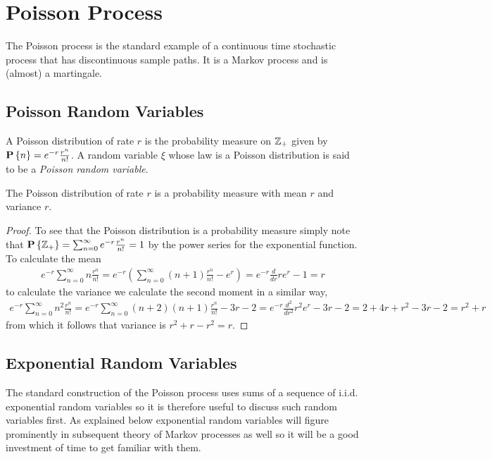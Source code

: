 \section{Poisson Process}
The Poisson process is the standard example of a continuous time
stochastic process that has discontinuous sample paths.  It is a
Markov process and is (almost) a martingale.  

\subsection{Poisson Random Variables}

\begin{defn}A Poisson distribution of rate $r$ is the probability
  measure on $\mathbb{Z}_+$ given by $\textbf{P}\left \{n \right \} = e^{-r}
  \frac{r^n}{n!}$. A random variable $\xi$ whose law is a Poisson
  distribution is said to be a \emph{Poisson random variable}.
\end{defn}

\begin{prop}\label{MomentsPoissonDistribution}The Poisson distribution of rate $r$ is a probability measure with mean $r$ and variance $r$.
\end{prop}
\begin{proof}
To see that the Poisson distribution is a probability measure simply note that $\textbf{P}\left \{\mathbb{Z}_+ \right \} = \sum_{n=0}^\infty  e^{-r} \frac{r^n}{n!} =1$ by the power series for the exponential function.  To calculate the mean 
\begin{align*}
e^{-r} \sum_{n=0}^\infty  n \frac{r^n}{n!} = e^{-r} \left( \sum_{n=0}^\infty  (n+1) \frac{r^n}{n!} - e^r \right) = e^{-r} \frac{d}{dr} re^r - 1 = r
\end{align*}
to calculate the variance we calculate the second moment in a similar way,
\begin{align*}
e^{-r} \sum_{n=0}^\infty  n^2 \frac{r^n}{n!} = e^{-r} \sum_{n=0}^\infty  (n+2) (n+1) \frac{r^n}{n!} - 3 r - 2  
= e^{-r} \frac{d^2}{dr^2} r^2 e^r - 3 r - 2  = 2 + 4 r + r^2 - 3r - 2 = r^2 + r
\end{align*}
from which it follows that variance is $r^2 + r - r^2 = r$.
\end{proof}

\subsection{Exponential Random Variables}
The standard construction of the Poisson process uses sums of a sequence of
i.i.d. exponential random variables so it is therefore useful to
discuss such random variables first.  As explained below exponential
random variables will figure prominently in subsequent theory of
Markov processes as well so it will be a good investment of time to
get familiar with them.

